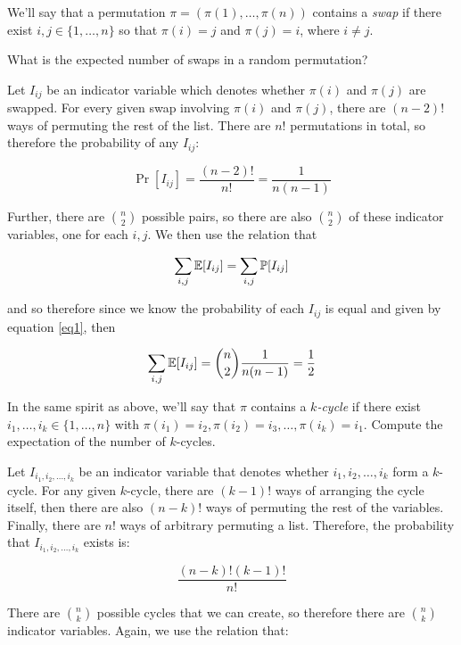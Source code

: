 \documentclass[11pt]{article}
\begin{document}
\pagebreak
{}

We'll say that a permutation $\pi = (\pi(1),\ldots,\pi(n))$ contains a \emph{swap} if there exist $i,j\in\{1,\ldots,n\}$ so that $\pi(i) = j$ and $\pi(j) = i$, where $i \neq j$. 
\begin{Parts}
	\Part What is the expected number of swaps in a random permutation?

	\begin{solution}
		Let $I_{ij}$ be an indicator variable which denotes whether $\pi(i)$ and $\pi(j)$ are swapped. For every given swap involving $\pi(i)$ and $\pi(j)$, there are $(n-2)!$ ways of permuting the rest of the list. There are $n!$ permutations in total, so therefore the probability of any $I_{ij}$: 

		\begin{equation}\label{eq1}
			\Pr[I_{ij}] = \frac{(n-2)!}{n!} = \frac{1}{n(n-1)}
		\end{equation}

		Further, there are ${n \choose 2}$ possible pairs, so there are also ${n \choose 2}$ of these indicator variables, one for each $i, j$. We then use the relation that 

		\[ \sum_{i, j}\operatorname{\mathbb{E}}[I_{ij}] = \sum_{i, j} \mathbb{P}[I_{ij}]\]

		and so therefore since we know the probability of each $I_{ij}$ is equal and given by equation \ref{eq1}, then 

		\[ \sum_{i, j} \operatorname{\mathbb{E}}[I_{ij}] = {n \choose 2} \frac{1}{n(n-1)} = \frac{1}{2}\]
	\end{solution}
	
	\Part In the same spirit as above, we'll say that $\pi$ contains a \emph{$k$-cycle} if there exist $i_1,\ldots,i_k \in \{1,\ldots,n\}$ with $\pi(i_1) = i_2,\pi(i_2) = i_3,\ldots,\pi(i_k) = i_1$. Compute the expectation of the number of $k$-cycles. 

	\begin{solution}
		Let $I_{i_1, i_2, \dots, i_k}$ be an indicator variable that denotes whether $i_1, i_2, \dots, i_k$ form a $k$-cycle. For any given $k$-cycle, there are $(k-1)!$ ways of arranging the cycle itself, then there are also $(n-k)!$ ways of permuting the rest of the variables. Finally, there are $n!$ ways of arbitrary permuting a list. Therefore, the probability that $I_{i_1, i_2, \dots, i_k}$ exists is: 

		\[ \frac{(n-k)!(k-1)!}{n!}\]

		There are ${n \choose k}$ possible cycles that we can create, so therefore there are $n \choose k$ indicator variables. Again, we use the relation that: 
		

\end{solution}
\end{Parts}
\end{document}
